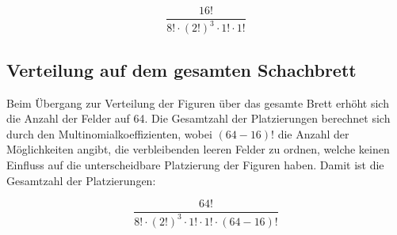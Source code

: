 \documentclass{article}
\begin{document}
\[
	\frac{16!}{8! \cdot (2!)^3 \cdot 1! \cdot 1!}
\]

\subsection*{Verteilung auf dem gesamten Schachbrett}
Beim Übergang zur Verteilung der Figuren über das gesamte Brett erhöht sich die Anzahl der Felder auf 64. Die Gesamtzahl der Platzierungen berechnet sich durch den Multinomialkoeffizienten, wobei \( (64-16)! \) die Anzahl der Möglichkeiten angibt, die verbleibenden leeren Felder zu ordnen, welche keinen Einfluss auf die unterscheidbare Platzierung der Figuren haben. Damit ist die Gesamtzahl der Platzierungen:

\[
	\frac{64!}{8! \cdot (2!)^3 \cdot 1! \cdot 1! \cdot (64-16)!}
\]
\end{document}
